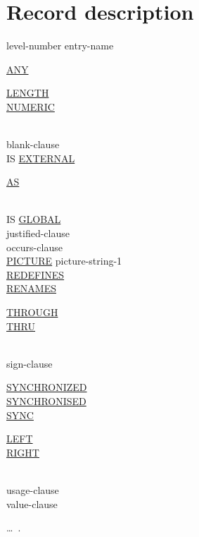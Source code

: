 \documentclass[a4paper,oneside,svgnames]{scrbook}
\makeatletter
\newcommand{\key}[1]{\underline{#1}}
\newcommand{\gnucobol}[1]{%
  \colorbox{orange!75}{#1}}
\newcommand{\miscext}[1]{%
  \colorbox{blue!50}{#1}}
\newenvironment{0-1}{$\left[ \begin{tabular}{@{}l@{}}}{\end{tabular} \right]$}
\newenvironment{1=}{$\left\{ \begin{tabular}{@{}l@{}}}{\end{tabular} \right\}$}
\makeatother
\begin{document}
\section{Record description}
level-number entry-name
\begin{0-1}
  \key{ANY}
  \begin{1=}
    \key{LENGTH} \\
    \gnucobol{\key{NUMERIC}}
  \end{1=} \\

  blank-clause \\

  IS \key{EXTERNAL}
  \begin{0-1}
    \key{AS} \literal
  \end{0-1} \\

  IS \key{GLOBAL} \\

  justified-clause \\

  occurs-clause \\

  \key{PICTURE} picture-string-1 \\

  \key{REDEFINES} \identifier \\

  \key{RENAMES} \identifier
  \begin{0-1}
    \begin{1=}
      \key{THROUGH} \\
      \key{THRU}
    \end{1=}
    \identifier
  \end{0-1} \\

  sign-clause \\

  \begin{1=}
    \key{SYNCHRONIZED} \\
    \miscext{\key{SYNCHRONISED}} \\
    \key{SYNC}
  \end{1=}
  \begin{0-1}
    \key{LEFT} \\
    \key{RIGHT}
  \end{0-1} \\

  usage-clause \\

  value-clause
\end{0-1}\ldots\ {}.
\end{document}
